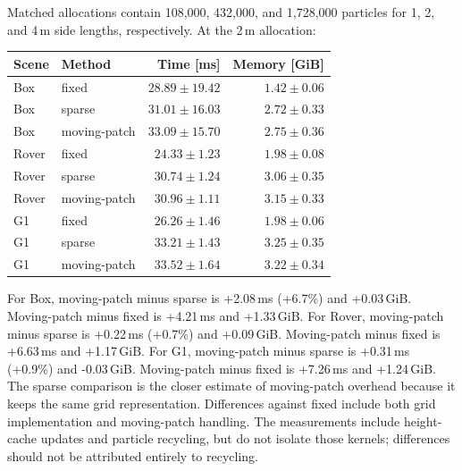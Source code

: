 Matched allocations contain 108,000, 432,000, and 1,728,000 particles for 1, 2, and 4\,m side lengths, respectively. At the 2\,m allocation:
\begin{center}\small\begin{tabular}{llrr}\toprule
Scene & Method & Time [ms] & Memory [GiB] \\\midrule
Box & fixed & $28.89\pm19.42$ & $1.42\pm0.06$ \\
Box & sparse & $31.01\pm16.03$ & $2.72\pm0.33$ \\
Box & moving-patch & $33.09\pm15.70$ & $2.75\pm0.36$ \\
Rover & fixed & $24.33\pm1.23$ & $1.98\pm0.08$ \\
Rover & sparse & $30.74\pm1.24$ & $3.06\pm0.35$ \\
Rover & moving-patch & $30.96\pm1.11$ & $3.15\pm0.33$ \\
G1 & fixed & $26.26\pm1.46$ & $1.98\pm0.06$ \\
G1 & sparse & $33.21\pm1.43$ & $3.25\pm0.35$ \\
G1 & moving-patch & $33.52\pm1.64$ & $3.22\pm0.34$ \\
\bottomrule\end{tabular}\end{center}
For Box, moving-patch minus sparse is +2.08\,ms (+6.7\%) and +0.03\,GiB. Moving-patch minus fixed is +4.21\,ms and +1.33\,GiB.
For Rover, moving-patch minus sparse is +0.22\,ms (+0.7\%) and +0.09\,GiB. Moving-patch minus fixed is +6.63\,ms and +1.17\,GiB.
For G1, moving-patch minus sparse is +0.31\,ms (+0.9\%) and -0.03\,GiB. Moving-patch minus fixed is +7.26\,ms and +1.24\,GiB.
The sparse comparison is the closer estimate of moving-patch overhead because it keeps the same grid representation. Differences against fixed include both grid implementation and moving-patch handling. The measurements include height-cache updates and particle recycling, but do not isolate those kernels; differences should not be attributed entirely to recycling.

